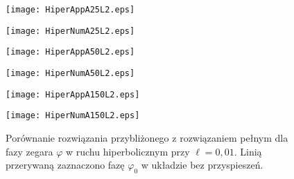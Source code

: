 \begin{figure}
\begin{minipage}[b]{.5\linewidth}
\centering
\texttt{[image: HiperAppA25L2.eps]}
\label{fig:2a1}
\end{minipage}%
\begin{minipage}[b]{.5\linewidth}
\centering
\texttt{[image: HiperNumA25L2.eps]}
\label{fig:2n1}
\end{minipage}
\begin{minipage}[b]{.5\linewidth}
\centering
\texttt{[image: HiperAppA50L2.eps]}
\label{fig:2a2}
\end{minipage}%
\begin{minipage}[b]{.5\linewidth}
\centering
\texttt{[image: HiperNumA50L2.eps]}
\label{fig:2n2}
\end{minipage}
\begin{minipage}[b]{.5\linewidth}
\centering
\texttt{[image: HiperAppA150L2.eps]}
\label{fig:2a3}
\end{minipage}%
\begin{minipage}[b]{.5\linewidth}
\centering
\texttt{[image: HiperNumA150L2.eps]}
\label{fig:2n3}
\end{minipage}
\caption{Porównanie rozwiązania przybliżonego z rozwiązaniem pełnym
dla fazy zegara $\varphi$ w ruchu hiperbolicznym przy
$\ell=0,01$. Linią przerywaną zaznaczono fazę 
$\varphi_0$ w układzie bez przyspieszeń. }\label{fig:2}
\end{figure}


